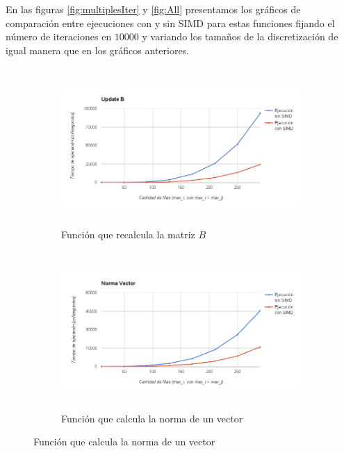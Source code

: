 \documentclass[a4paper]{article}
\begin{document}
En las figuras \ref{fig:multiplesIter} y \ref{fig:All} presentamos 
los gráficos de comparación entre ejecuciones con y sin SIMD para 
estas funciones fijando el número de iteraciones en $10000$ y variando 
los tamaños de la discretización de igual manera que en los gráficos 
anteriores.

\begin{figure}[!htbp]
\centering
\begin{subfigure}{.5\textwidth}
  \centering
	\hspace{-1.5cm}\includegraphics[height=6cm, width=\linewidth]{images/UpdateB.png}
  \caption{Función que recalcula la matriz $B$}
	\label{fig:UpdateB}
\end{subfigure}%
\begin{subfigure}{.5\textwidth}
  \centering
	\includegraphics[height=6cm, width=\linewidth]{images/NormVector.png}
  \caption{Función que calcula la norma de un vector}
  \label{fig:NormVector}
\end{subfigure}


\end{figure}
\end{document}

